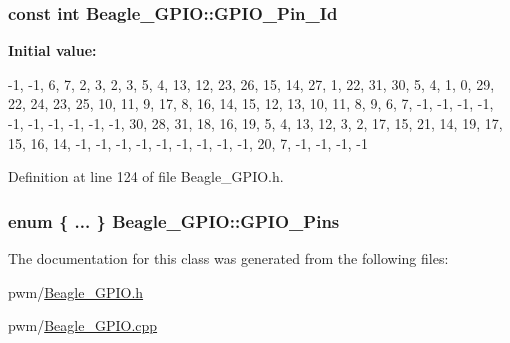 \hypertarget{class_beagle___g_p_i_o_a9a48339b54de8e6c884ddad8629a3647}{
\subsubsection[{\-G\-P\-I\-O\-\_\-\-Pin\-\_\-\-Id}]{\setlength{\rightskip}{0pt plus 5cm}const int {\bf \-Beagle\-\_\-\-G\-P\-I\-O\-::\-G\-P\-I\-O\-\_\-\-Pin\-\_\-\-Id}}}\label{class_beagle___g_p_i_o_a9a48339b54de8e6c884ddad8629a3647}
{\bfseries \-Initial value\-:}
\begin{DoxyCode}
 
{
        -1, -1,  6,  7,  2,     
         3,  2,  3,  5,  4,     
        13, 12, 23, 26, 15,     
        14, 27,  1, 22, 31,     
        30,  5,  4,  1,  0,     
        29, 22, 24, 23, 25,     
        10, 11,  9, 17,  8,     
        16, 14, 15, 12, 13,     
        10, 11,  8,  9,  6,     
         7,                     
        -1, -1, -1, -1, -1,     
        -1, -1, -1, -1, -1,     
        30, 28, 31, 18, 16,     
        19,  5,  4, 13, 12,     
         3,  2, 17, 15, 21,     
        14, 19, 17, 15, 16,     
        14, -1, -1, -1, -1,     
        -1, -1, -1, -1, -1,     
        20,  7, -1, -1, -1,     
        -1                      
}
\end{DoxyCode}


\-Definition at line 124 of file \-Beagle\-\_\-\-G\-P\-I\-O.\-h.

\hypertarget{class_beagle___g_p_i_o_aa33c6977896ab86e6b493646fcf6c3eb}{
\subsubsection[{\-G\-P\-I\-O\-\_\-\-Pins}]{\setlength{\rightskip}{0pt plus 5cm}enum \{ ... \}   {\bf \-Beagle\-\_\-\-G\-P\-I\-O\-::\-G\-P\-I\-O\-\_\-\-Pins}}}\label{class_beagle___g_p_i_o_aa33c6977896ab86e6b493646fcf6c3eb}


\-The documentation for this class was generated from the following files\-:\begin{DoxyCompactItemize}
\item 
pwm/\hyperlink{_beagle___g_p_i_o_8h}{\-Beagle\-\_\-\-G\-P\-I\-O.\-h}\item 
pwm/\hyperlink{_beagle___g_p_i_o_8cpp}{\-Beagle\-\_\-\-G\-P\-I\-O.\-cpp}\end{DoxyCompactItemize}
